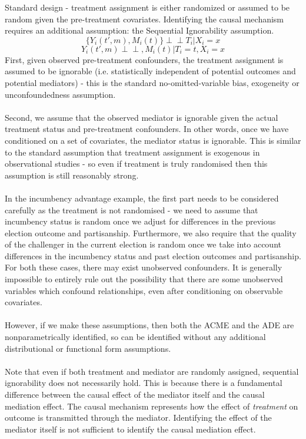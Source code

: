 \documentclass{article}
\newcommand{\indep}{\perp\!\!\!\!\perp}
\begin{document}
	Standard design - treatment assignment is either randomized or assumed to be random given the pre-treatment covariates. Identifying the causal mechanism requires an additional assumption: the Sequential Ignorability assumption. 
	\begin{equation}
		\{Y_i(t',m), M_i(t)\} \indep T_i | X_i = x 
	\end{equation}
	\begin{equation}
		Y_i(t',m) \indep , M_i(t) | T_i =t, X_i = x 
	\end{equation}
	First, given observed pre-treatment confounders, the treatment assignment is assumed to be ignorable (i.e. statistically independent of potential outcomes and potential mediators) - this is the standard no-omitted-variable bias, exogeneity or unconfoundedness assumption. 
	\\~\\
	Second, we assume that the observed mediator is ignorable given the actual treatment status and pre-treatment confounders. In other words, once we have conditioned on a set of covariates, the mediator status is ignorable. This is similar to the standard assumption that treatment assignment is exogenous in observational studies - so even if treatment is truly randomised then this assumption is still reasonably strong. 
	\\~\\
	In the incumbency advantage example, the first part needs to be considered carefully as the treatment is not randomised - we need to assume that incumbency status is random once we adjust for differences in the previous election outcome and partisanship. Furthermore, we also require that the quality of the challenger in the current election is random once we take into account differences in the incumbency status and past election outcomes and partisanship. For both these cases, there may exist unobserved confounders. It is generally impossible to entirely rule out the possibility that there are some unobserved variables which confound relationships, even after conditioning on observable covariates. 
	\\~\\
	However, if we make these assumptions, then both the ACME and the ADE are nonparametrically identified, so can be identified without any additional distributional or functional form assumptions. 
	\\~\\
	Note that even if both treatment and mediator are randomly assigned, sequential ignorability does not necessarily hold. This is because there is a fundamental difference between the causal effect of the mediator itself and the causal mediation effect. The causal mechanism represents how the effect of \textit{treatment} on outcome is transmitted through the mediator. Identifying the effect of the mediator itself is not sufficient to identify the causal mediation effect. 
\end{document}

